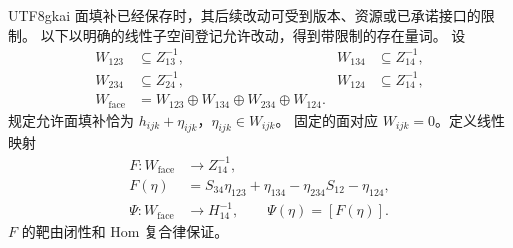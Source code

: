 \documentclass[12pt,a4paper,openany,notitlepage]{report}
\theoremstyle{plain}
\theoremstyle{definition}
\theoremstyle{remark}
\begin{document}
\begin{CJK*}{UTF8}{gkai}
面填补已经保存时，其后续改动可受到版本、资源或已承诺接口的限制。
以下以明确的线性子空间登记允许改动，得到带限制的存在量词。
设
\[
 \begin{aligned}
 W_{123}&\subseteq Z^{-1}_{13},&
 W_{134}&\subseteq Z^{-1}_{14},\\
 W_{234}&\subseteq Z^{-1}_{24},&
 W_{124}&\subseteq Z^{-1}_{14},\\
 W_{\mathrm{face}}
 &=W_{123}\oplus W_{134}\oplus W_{234}\oplus W_{124}.
 \end{aligned}
\]
规定允许面填补恰为 $h_{ijk}+\eta_{ijk}$，$\eta_{ijk}\in W_{ijk}$。
固定的面对应 $W_{ijk}=0$。定义线性映射
\[
 \begin{aligned}
 F:W_{\mathrm{face}}&\longrightarrow Z^{-1}_{14},\\
 F(\eta)&=S_{34}\eta_{123}+\eta_{134}
          -\eta_{234}S_{12}-\eta_{124},\\
 \Psi:W_{\mathrm{face}}&\longrightarrow H^{-1}_{14},
 \qquad \Psi(\eta)=[F(\eta)].
 \end{aligned}
\]
$F$ 的靶由闭性和 Hom 复合律保证。


\end{CJK*}
\end{document}
